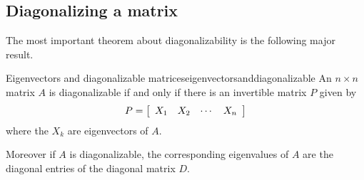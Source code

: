 \subsection{Diagonalizing a matrix}

The most important theorem about diagonalizability is the following major result.

\begin{theorem}{Eigenvectors and diagonalizable matrices}{eigenvectorsanddiagonalizable}
An $n\times n$ matrix $A$ is diagonalizable if and only if there is an
invertible matrix $P$ given by 
\begin{equation*}
P=\left[
\begin{array}{cccc}
X_{1} & X_{2} & \cdots & X_{n}
\end{array}
\right]
\end{equation*}
where the $X_{k}$ are eigenvectors of $A$. 

Moreover if $A$ is diagonalizable, the corresponding eigenvalues of $A$ are the
diagonal entries of the diagonal matrix $D$.
\end{theorem}

